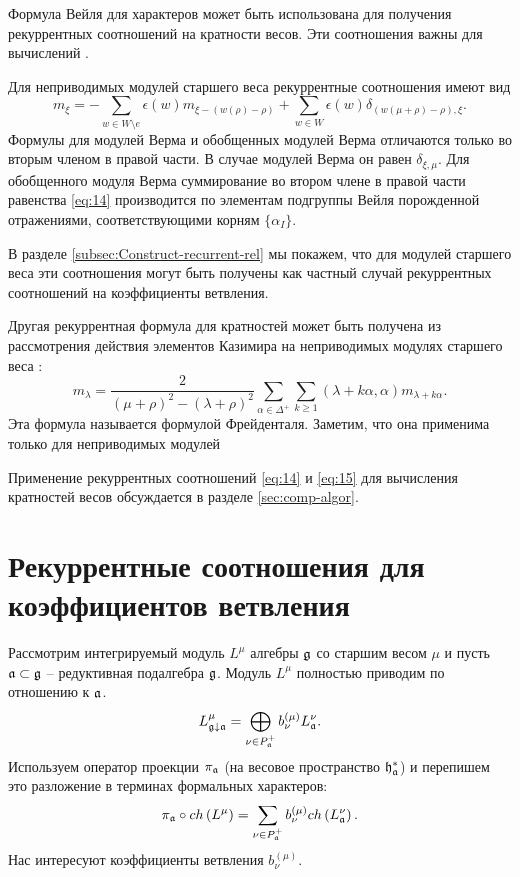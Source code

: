
Формула Вейля для характеров может быть использована для получения рекуррентных соотношений на кратности весов. Эти соотношения важны для вычислений \cite{il2010folded,kulish4sfa}. 

Для неприводимых модулей старшего веса рекуррентные соотношения имеют вид
\begin{equation}
\label{eq:14}
m_{\xi }=-\sum_{w\in W\setminus e}\epsilon (w)m_{\xi
-\left( w(\rho )-\rho \right) }+\sum_{w\in W}\epsilon
(w)\delta _{\left( w(\mu +\rho )-\rho \right) ,\xi }.
\end{equation}
Формулы для модулей Верма и обобщенных модулей Верма отличаются только во вторым членом в правой части. В случае модулей Верма он равен $\delta_{\xi,\mu}$. Для обобщенного модуля Верма суммирование во втором члене в правой части равенства \eqref{eq:14} производится по элементам подгруппы Вейля порожденной отражениями, соответствующими корням $\{\alpha_{I}\}$.

В разделе \ref{subsec:Construct-recurrent-rel} мы покажем, что для модулей старшего веса эти соотношения могут быть получены как частный случай рекуррентных соотношений на коэффициенты ветвления.

Другая рекуррентная формула для кратностей может быть получена из рассмотрения действия элементов Казимира на неприводимых модулях старшего веса \cite{humphreys1997introduction}:
\begin{equation}
  \label{eq:15}
  m_{\lambda}=\frac{2}{(\mu+\rho)^{2}-(\lambda+\rho)^{2}}\sum_{\alpha\in \Delta^{+}}\sum_{k\geq 1} (\lambda+k\alpha,\alpha)m_{\lambda+k\alpha}.
\end{equation}
Эта формула называется формулой Фрейденталя. Заметим, что она применима только для неприводимых модулей

Применение рекуррентных соотношений \eqref{eq:14} и \eqref{eq:15} для вычисления кратностей весов обсуждается в разделе \ref{sec:comp-algor}. 

\section{Рекуррентные соотношения для коэффициентов ветвления}
\label{sec:branching}

Рассмотрим интегрируемый модуль $L^{\mu }$ алгебры $\mathfrak{g}$ со старшим весом  $\mu$ и пусть  $\mathfrak{a}\subset\mathfrak{g}$ -- редуктивная подалгебра $\mathfrak{g}$. Модуль $L^{\mu}$ полностью приводим по отношению к $\mathfrak{a}$.
\begin{equation*}
 L_{\mathfrak{g}\downarrow \mathfrak{a}}^{\mu }=\bigoplus
\limits_{\nu \in P_{\mathfrak{a}}^{+}}b_{\nu }^{\left( \mu \right) }L_{\mathfrak{a}}^{\nu }.
\end{equation*}
Используем оператор проекции  $\pi_{\mathfrak{a}}$ (на весовое пространство $\mathfrak{h}_{\mathfrak{a}}^*$) и перепишем это разложение в терминах формальных характеров:
\begin{equation}
\label{branching1}
 \pi _{\mathfrak{a}}\circ ch\left( L^{\mu }\right)
 =\sum_{\nu \in P_{\mathfrak{a}}^{+}}b_{\nu }^{(\mu)}ch\left( L_{\mathfrak{a}}^{\nu }\right) .
\end{equation}
Нас интересуют коэффициенты ветвления $b^{(\mu)}_{\nu}$.

